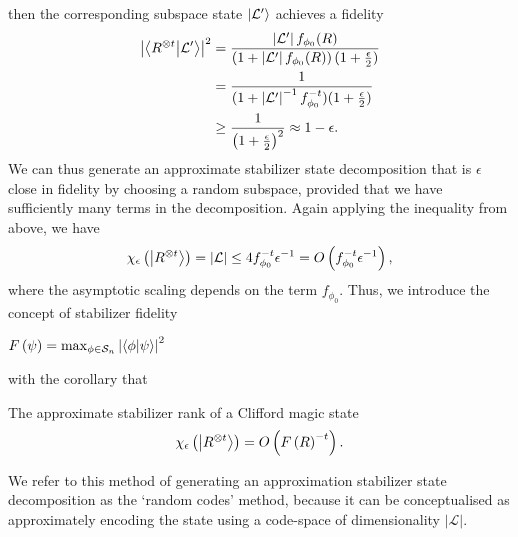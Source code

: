 then the corresponding subspace state $\ket{\mathcal{L'}}$ achieves a fidelity
\begin{align}
\left|\braket{R^{\otimes t}}{\mathcal{L'}}\right|^{2}&=\frac{\left|\mathcal{L'}\right|f_{\phi_{0}}(R)}{\left(1+\left|\mathcal{L'}\right|f_{\phi_{0}}(R)\right)(1+\frac{\epsilon}{2})}\nonumber \\
&= \frac{1}{(1+\left|\mathcal{L'}\right|^{-1}f_{\phi_{0}}^{-t})(1+\frac{\epsilon}{2})} \nonumber \\
&\geq \frac{1}{\left(1+\frac{\epsilon}{2}\right)^{2}} \approx 1 - \epsilon.
\label{eq:clifford_fidelity}
\end{align}
We can thus generate an approximate stabilizer state decomposition that is $\epsilon$ close in fidelity by choosing a random subspace, provided that we have sufficiently many terms in the decomposition. Again applying the inequality from above, we have
\begin{equation}
\chi_{\epsilon}\left(\ket{R^{\otimes t}}\right) = \left|\mathcal{L}\right| \leq 4 f_{\phi_{0}}^{-t}\epsilon^{-1}=O\left(f_{\phi_{0}}^{-t}\epsilon^{-1}\right),
\label{eq:clifford_approx_rank}
\end{equation}
where the asymptotic scaling depends on the term $f_{\phi_{0}}$. Thus, we introduce the concept of stabilizer fidelity
\begin{defn}
$F\left(\psi\right) = \max_{\phi \in\mathcal{S}_{n}} \left|\braket{\phi}{\psi}\right|^{2}$
\label{def:stabilizer_fidelity}
\end{defn}
with the corollary that
\begin{cor}
The approximate stabilizer rank of a Clifford magic state 
\[\chi_{\epsilon}\left(\ket{R^{\otimes t}}\right) = O\left(F\left(R\right)^{-t}\right).\]
\end{cor}
We refer to this method of generating an approximation stabilizer state decomposition as the `random codes' method, because it can be conceptualised as approximately encoding the state using a code-space of dimensionality $\left|\mathcal{L}\right|$.

